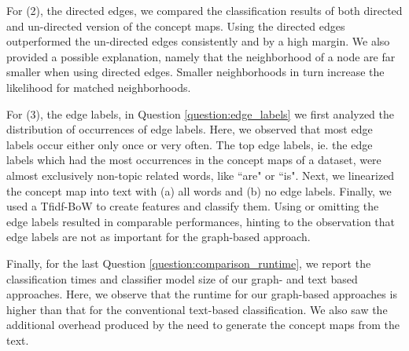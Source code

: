 For (2), the directed edges, we compared the classification results of both directed and un-directed version of the concept maps.
Using the directed edges outperformed the un-directed edges consistently and by a high margin.
We also provided a possible explanation, namely that the neighborhood of a node are far smaller when using directed edges.
Smaller neighborhoods in turn increase the likelihood for matched neighborhoods.

For (3), the edge labels, in Question \ref{question:edge_labels} we first analyzed the distribution of occurrences of edge labels. Here, we observed that most edge labels occur either only once or very often.
The top edge labels, ie. the edge labels which had the most occurrences in the concept maps of a dataset, were almost exclusively non-topic related words, like ``are" or ``is".
Next, we linearized the concept map into text with (a) all words and (b) no edge labels.
Finally, we used a Tfidf-BoW to create features and classify them.
Using or omitting the edge labels resulted in comparable performances, hinting to the observation that edge labels are not as important for the graph-based approach.

Finally, for the last Question \ref{question:comparison_runtime}, we report the classification times and classifier model size of our graph- and text based approaches.
Here, we observe that the runtime for our graph-based approaches is higher than that for the conventional text-based classification.
We also saw the additional overhead produced by the need to generate the concept maps from the text.

